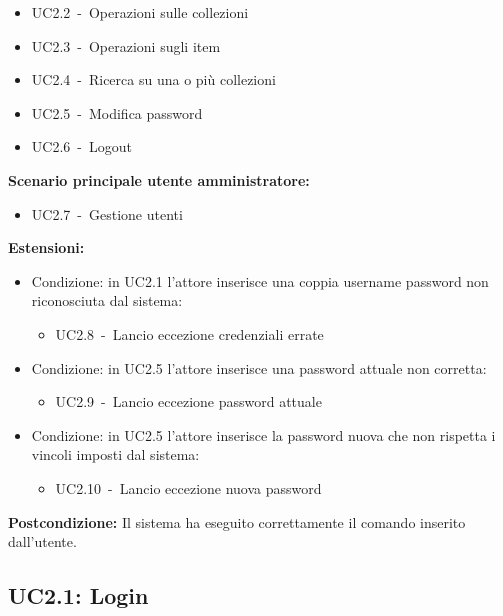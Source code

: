 \documentclass{scalatekids-article}
\begin{document}
\begin{itemize}
\item UC2.2\ -\ Operazioni sulle collezioni
\item UC2.3\ -\ Operazioni sugli item
\item UC2.4\ -\ Ricerca su una o più collezioni
\item UC2.5\ -\ Modifica password
\item UC2.6\ -\ Logout
\end{itemize}
\textbf{Scenario principale utente amministratore:}
\begin{itemize}
\item UC2.7\ -\ Gestione utenti
\end{itemize}
\textbf{Estensioni:}
\begin{itemize}
\item Condizione: in UC2.1 l'attore inserisce una coppia username password non riconosciuta dal sistema:
  \begin{itemize}
  \item UC2.8\ -\ Lancio eccezione credenziali errate
  \end{itemize}
\item Condizione: in UC2.5 l'attore inserisce una password attuale non corretta:
  \begin{itemize}
  \item UC2.9\ -\ Lancio eccezione password attuale
  \end{itemize}
\item Condizione: in UC2.5 l'attore inserisce la password nuova che non rispetta i vincoli imposti dal sistema: %
  \begin{itemize}
  \item UC2.10\ -\ Lancio eccezione nuova password
  \end{itemize}
\end{itemize}
\textbf{Postcondizione:} Il sistema ha eseguito correttamente il comando inserito dall'utente.

\subsection{UC2.1: Login}
\end{document}
